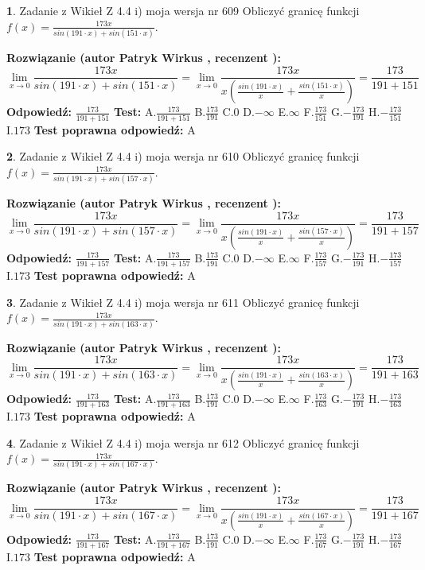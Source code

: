 \documentclass[12pt, a4paper]{article}
\theoremstyle{definition} %
\newtheorem{zad}{}
\newcommand{\zadStart}[1]{\begin{zad}#1\newline}
\newcommand{\zadStop}{\end{zad}}
\newcommand{\rozwStart}[2]{\noindent \textbf{Rozwiązanie (autor #1 , recenzent #2): }\newline}
\newcommand{\rozwStop}{\newline}
\newcommand{\odpStart}{\noindent \textbf{Odpowiedź:}\newline}
\newcommand{\odpStop}{\newline}
\newcommand{\testStart}{\noindent \textbf{Test:}\newline}
\newcommand{\testStop}{\newline}
\newcommand{\kluczStart}{\noindent \textbf{Test poprawna odpowiedź:}\newline}
\newcommand{\kluczStop}{\newline}
\begin{document}
\zadStart{Zadanie z Wikieł Z 4.4 i) moja wersja nr 609}
Obliczyć granicę funkcji $f(x)=\frac{173x}{sin(191\cdot x) +sin(151\cdot x)}$.
\zadStop
\rozwStart{Patryk Wirkus}{}
$$\lim\limits_{x\to 0}\frac{173x}{sin(191\cdot x) +sin(151\cdot x)}=\lim\limits_{x\to 0}\frac{173x}{x(\frac{sin(191\cdot x)}{x}+\frac{sin(151\cdot x)}{x})}=\frac{173}{191+151}$$
\rozwStop
\odpStart
$\frac{173}{191+151}$
\odpStop
\testStart
A.$\frac{173}{191+151}$
B.$\frac{173}{191}$
C.$0$
D.$-\infty$
E.$\infty$
F.$\frac{173}{151}$
G.$-\frac{173}{191}$
H.$-\frac{173}{151}$
I.$173$
\testStop
\kluczStart
A
\kluczStop



\zadStart{Zadanie z Wikieł Z 4.4 i) moja wersja nr 610}
Obliczyć granicę funkcji $f(x)=\frac{173x}{sin(191\cdot x) +sin(157\cdot x)}$.
\zadStop
\rozwStart{Patryk Wirkus}{}
$$\lim\limits_{x\to 0}\frac{173x}{sin(191\cdot x) +sin(157\cdot x)}=\lim\limits_{x\to 0}\frac{173x}{x(\frac{sin(191\cdot x)}{x}+\frac{sin(157\cdot x)}{x})}=\frac{173}{191+157}$$
\rozwStop
\odpStart
$\frac{173}{191+157}$
\odpStop
\testStart
A.$\frac{173}{191+157}$
B.$\frac{173}{191}$
C.$0$
D.$-\infty$
E.$\infty$
F.$\frac{173}{157}$
G.$-\frac{173}{191}$
H.$-\frac{173}{157}$
I.$173$
\testStop
\kluczStart
A
\kluczStop



\zadStart{Zadanie z Wikieł Z 4.4 i) moja wersja nr 611}
Obliczyć granicę funkcji $f(x)=\frac{173x}{sin(191\cdot x) +sin(163\cdot x)}$.
\zadStop
\rozwStart{Patryk Wirkus}{}
$$\lim\limits_{x\to 0}\frac{173x}{sin(191\cdot x) +sin(163\cdot x)}=\lim\limits_{x\to 0}\frac{173x}{x(\frac{sin(191\cdot x)}{x}+\frac{sin(163\cdot x)}{x})}=\frac{173}{191+163}$$
\rozwStop
\odpStart
$\frac{173}{191+163}$
\odpStop
\testStart
A.$\frac{173}{191+163}$
B.$\frac{173}{191}$
C.$0$
D.$-\infty$
E.$\infty$
F.$\frac{173}{163}$
G.$-\frac{173}{191}$
H.$-\frac{173}{163}$
I.$173$
\testStop
\kluczStart
A
\kluczStop



\zadStart{Zadanie z Wikieł Z 4.4 i) moja wersja nr 612}
Obliczyć granicę funkcji $f(x)=\frac{173x}{sin(191\cdot x) +sin(167\cdot x)}$.
\zadStop
\rozwStart{Patryk Wirkus}{}
$$\lim\limits_{x\to 0}\frac{173x}{sin(191\cdot x) +sin(167\cdot x)}=\lim\limits_{x\to 0}\frac{173x}{x(\frac{sin(191\cdot x)}{x}+\frac{sin(167\cdot x)}{x})}=\frac{173}{191+167}$$
\rozwStop
\odpStart
$\frac{173}{191+167}$
\odpStop
\testStart
A.$\frac{173}{191+167}$
B.$\frac{173}{191}$
C.$0$
D.$-\infty$
E.$\infty$
F.$\frac{173}{167}$
G.$-\frac{173}{191}$
H.$-\frac{173}{167}$
I.$173$
\testStop
\kluczStart
A
\kluczStop
\end{document}
